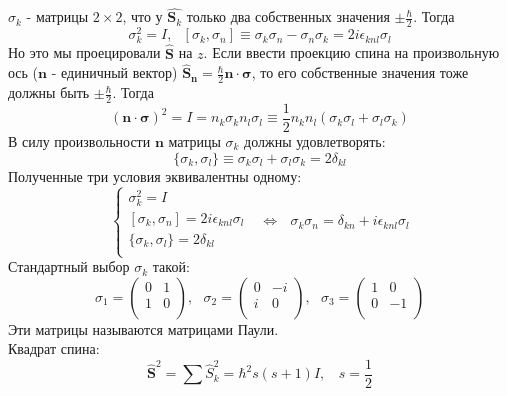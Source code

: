 	$\sigma_k$ - матрицы $2\times2$, что у $\hat{\textbf{S}_k}$ только два собственных значения $\pm\frac{\hbar}{2}$. Тогда
	$$
		\sigma^2_k = I,  \ \ \ [\sigma_k, \sigma_n] \equiv \sigma_k\sigma_n-\sigma_n\sigma_k = 2i\epsilon_{knl}\sigma_l
	$$
	Но это мы проецировали $\hat{\textbf{S}}$ на $z$. Если ввести проекцию спина на произвольную ось ($\textbf{n}$ - единичный вектор) $\hat{\textbf{S}}_{\textbf{n}} = \frac{\hbar}{2}\textbf{n}\cdot\bm{\sigma}$, то его собственные значения тоже должны быть $\pm\frac{\hbar}{2}$. Тогда 
	$$
		(\textbf{n}\cdot\bm{\sigma})^2 = I = n_k\sigma_k n_l\sigma_l \equiv \frac{1}{2}n_k n_l(\sigma_k\sigma_l + \sigma_l\sigma_k)
	$$
	В силу произвольности $\textbf{n}$ матрицы $\sigma_k$ должны удовлетворять:
	$$
		\{\sigma_k,\sigma_l\} \equiv \sigma_k\sigma_l + \sigma_l\sigma_k = 2\delta_{kl}
	$$
	Полученные три условия эквивалентны одному:
	$$
		\left\{
			\begin{array}{l}
				\sigma^2_k = I\\
				\left[\sigma_k, \sigma_n\right] = 2i\epsilon_{knl}\sigma_l\\
				\{\sigma_k,\sigma_l\} = 2\delta_{kl}\\
			\end{array}
		\right.
		 \ \ \ \Leftrightarrow  \ \ \ \sigma_k\sigma_n = \delta_{kn} + i\epsilon_{knl}\sigma_l
	$$
	Стандартный выбор $\sigma_k$ такой:
	$$
		\sigma_1 = \left( 
		\begin{array}{cc}
			0 & 1\\
			1 & 0\\
		\end{array} 
		\right), \ \ \ 
		\sigma_2 = \left( 
		\begin{array}{cc}
		0 & -i\\
		i & 0\\
		\end{array} 
		\right), \ \ \
		\sigma_3 = \left( 
		\begin{array}{cc}
		1 & 0\\
		0 & -1\\
		\end{array} 
		\right)
	$$
	Эти матрицы называются матрицами Паули. \\
	Квадрат спина:
	$$
		\hat{\textbf{S}}^2 = \sum\hat{S}_k^2 = \hbar^2 s(s+1) I, \ \ \ \ s = \frac{1}{2}
	$$
